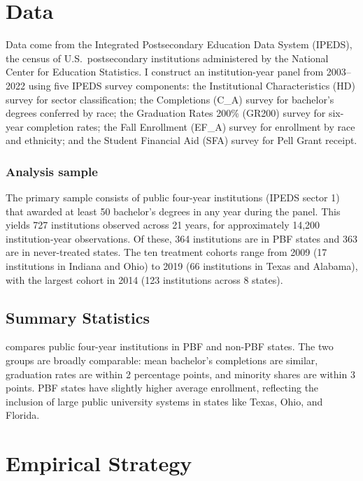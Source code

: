 \documentclass[12pt]{article}
\begin{document}
\section{Data}

Data come from the Integrated Postsecondary Education Data System (IPEDS), the census of U.S.\ postsecondary institutions administered by the National Center for Education Statistics. I construct an institution-year panel from 2003--2022 using five IPEDS survey components: the Institutional Characteristics (HD) survey for sector classification; the Completions (C\_A) survey for bachelor's degrees conferred by race; the Graduation Rates 200\% (GR200) survey for six-year completion rates; the Fall Enrollment (EF\_A) survey for enrollment by race and ethnicity; and the Student Financial Aid (SFA) survey for Pell Grant receipt.

\subsubsection*{Analysis sample} The primary sample consists of public four-year institutions (IPEDS sector 1) that awarded at least 50 bachelor's degrees in any year during the panel. This yields 727 institutions observed across 21 years, for approximately 14,200 institution-year observations. Of these, 364 institutions are in PBF states and 363 are in never-treated states. The ten treatment cohorts range from 2009 (17 institutions in Indiana and Ohio) to 2019 (66 institutions in Texas and Alabama), with the largest cohort in 2014 (123 institutions across 8 states).

\subsection{Summary Statistics}



 compares public four-year institutions in PBF and non-PBF states. The two groups are broadly comparable: mean bachelor's completions are similar, graduation rates are within 2 percentage points, and minority shares are within 3 points. PBF states have slightly higher average enrollment, reflecting the inclusion of large public university systems in states like Texas, Ohio, and Florida.

\section{Empirical Strategy}
\end{document}
